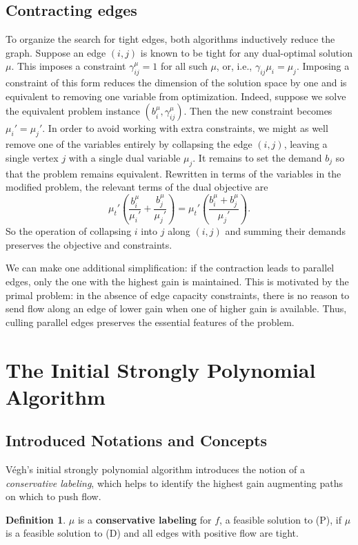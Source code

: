 \documentclass[11pt]{article}
\theoremstyle{definition}
\newtheorem{definition}{Definition}[section]
\theoremstyle{definition}
\newcommand{\biu}{b_{i}^{\mu}}
\newcommand{\gij}{\gamma_{ij}}
\newcommand{\giij}{\gamma_{ij}^{\mu}}
\begin{document}
    \subsection{Contracting edges}\label{sec:contract}
    To organize the search for tight edges, both algorithms inductively reduce the graph.
    Suppose an edge $(i, j)$ is known to be tight for any dual-optimal solution $\mu$. This
    imposes a constraint $\giij = 1$ for all such $\mu$, or, i.e., $\gij \mu_i = \mu_j$.
    Imposing a constraint of this form reduces the dimension of the solution
    space by one and is equivalent to removing one variable from optimization. Indeed,
    suppose we solve the equivalent problem instance $(\biu, \giij)$. Then the new constraint
    becomes $\mu_i' = \mu_j'$. In order to avoid working with extra constraints, we might
    as well remove one of the variables entirely by collapsing the edge $(i, j)$, leaving a single
    vertex $j$ with a single dual variable $\mu_j$. It remains to set the demand $b_j$ so
    that the problem remains equivalent. Rewritten in terms of the variables in
    the modified problem, the relevant terms of the dual objective are
    \[ \mu_t' \left(\frac{b_i^\mu}{\mu_i'} + \frac{b_j^\mu}{\mu_j'}\right)
     = \mu_t' \left(\frac{b_i^\mu + b_j^\mu}{\mu_j'}\right). \]
	So the operation of collapsing $i$ into $j$ along $(i, j)$ and summing their demands
	preserves the objective and constraints.
	
	We can make one additional simplification: if the contraction leads to parallel edges,
	only the one with the highest gain is maintained. This is motivated by the primal problem: in
	the absence of edge capacity constraints, there is no reason to send flow along an edge of
	lower gain when one of higher gain is available. Thus, culling parallel edges preserves the
	essential features of the problem.
	

\section{The Initial Strongly Polynomial Algorithm}
\label{sec:2013}
	\subsection{Introduced Notations and Concepts}
    \label{sec:2013-notation}
	Végh's initial strongly polynomial algorithm \cite{Vegh2013}
	introduces the notion of a \textit{conservative labeling}, which helps to
	identify the highest gain augmenting paths on which to push flow.
	\begin{definition}
	$\mu$ is a \textbf{conservative labeling} for $f$, a feasible solution to (P), if $\mu$ is
	a feasible solution to (D) and all edges with positive flow are tight.
	\end{definition}
	
\end{document}
